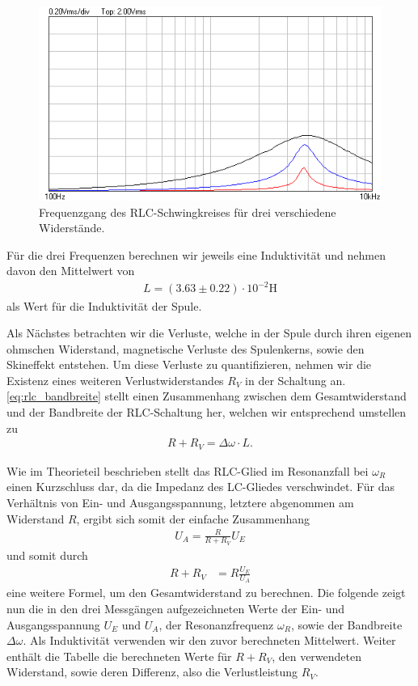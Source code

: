 \begin{figure}[H]
  \centering
  \includegraphics[width=.8\textwidth]{files/aufgabe4_frequenzgang_schwingkreis.png}
  \caption{Frequenzgang des RLC-Schwingkreises für drei verschiedene Widerstände.}
  \label{fig:aufgabe4_frequenzgang_schwingkreis}
\end{figure}

Für die drei Frequenzen berechnen wir jeweils eine Induktivität und nehmen davon den Mittelwert von
\begin{align}
  L = (3.63 \pm 0.22) \cdot 10^{-2} \si{\henry}
\end{align}
als Wert für die Induktivität der Spule.

Als Nächstes betrachten wir die Verluste, welche in der Spule durch ihren eigenen ohmschen Widerstand, magnetische Verluste des Spulenkerns, sowie den Skineffekt entstehen. Um diese Verluste zu quantifizieren, nehmen wir die Existenz eines weiteren Verlustwiderstandes $R_V$ in der Schaltung an. \eqref{eq:rlc_bandbreite} stellt einen Zusammenhang zwischen dem Gesamtwiderstand und der Bandbreite der RLC-Schaltung her, welchen wir entsprechend umstellen zu
\begin{align}
  R + R_V = \Delta \omega \cdot L.
\end{align}

Wie im Theorieteil beschrieben stellt das RLC-Glied im Resonanzfall bei $\omega_R$ einen Kurzschluss dar, da die Impedanz des LC-Gliedes verschwindet. Für das Verhältnis von Ein- und Ausgangsspannung, letztere abgenommen am Widerstand $R$, ergibt sich somit der einfache Zusammenhang
\begin{align}
  U_A = \frac{R}{R + R_V} U_E
\end{align}
und somit durch
\begin{align}
  R + R_V &= R \frac{U_E}{U_A}
\end{align}
eine weitere Formel, um den Gesamtwiderstand zu berechnen. Die folgende  zeigt nun die in den drei Messgängen aufgezeichneten Werte der Ein- und Ausgangsspannung $U_E$ und $U_A$, der Resonanzfrequenz $\omega_R$, sowie der Bandbreite $\Delta \omega$. Als Induktivität verwenden wir den zuvor berechneten Mittelwert. Weiter enthält die Tabelle die berechneten Werte für $R + R_V$, den verwendeten Widerstand, sowie deren Differenz, also die Verlustleistung $R_V$.

